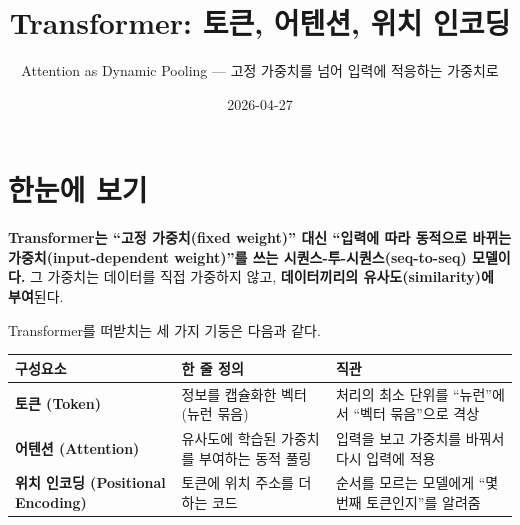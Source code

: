 \documentclass[
  korean,
]{article}
\title{Transformer: 토큰, 어텐션, 위치 인코딩}
\subtitle{Attention as Dynamic Pooling --- 고정 가중치를 넘어 입력에
적응하는 가중치로}
\author{}
\date{2026-04-27}
\newcounter{none} %
\renewcommand*\contentsname{목차}
\newcommand\contentsname{목차}
\begin{document}
\maketitle

\renewcommand*\contentsname{목차}
{
\setcounter{tocdepth}{3}
\tableofcontents
}

\section{한눈에 보기}\label{sec-overview}

\begin{tcolorbox}[enhanced jigsaw, arc=.35mm, bottomrule=.15mm, bottomtitle=1mm, breakable, colback=white, colbacktitle=quarto-callout-tip-color!10!white, colframe=quarto-callout-tip-color-frame, coltitle=black, left=2mm, leftrule=.75mm, opacityback=0, opacitybacktitle=0.6, rightrule=.15mm, title=\textcolor{quarto-callout-tip-color}{\faLightbulb}\hspace{0.5em}{핵심 한 줄}, titlerule=0mm, toprule=.15mm, toptitle=1mm]

\textbf{Transformer는 ``고정 가중치(fixed weight)'' 대신 ``입력에 따라
동적으로 바뀌는 가중치(input-dependent weight)''를 쓰는
시퀀스-투-시퀀스(seq-to-seq) 모델이다.} 그 가중치는 데이터를 직접
가중하지 않고, \textbf{데이터끼리의 유사도(similarity)에 부여}된다.

\end{tcolorbox}

Transformer를 떠받치는 세 가지 기둥은 다음과 같다.

{\def\LTcaptype{none} %
\begin{longtable}[]{@{}
  >{\raggedright\arraybackslash}p{}
  >{\raggedright\arraybackslash}p{}
  >{\raggedright\arraybackslash}p{}@{}}
\toprule\noalign{}
\begin{minipage}[b]{\linewidth}\raggedright
구성요소
\end{minipage} & \begin{minipage}[b]{\linewidth}\raggedright
한 줄 정의
\end{minipage} & \begin{minipage}[b]{\linewidth}\raggedright
직관
\end{minipage} \\
\midrule\noalign{}
\endhead
\bottomrule\noalign{}
\endlastfoot
\textbf{토큰 (Token)} & 정보를 캡슐화한 벡터(뉴런 묶음) & 처리의 최소
단위를 ``뉴런''에서 ``벡터 묶음''으로 격상 \\
\textbf{어텐션 (Attention)} & 유사도에 학습된 가중치를 부여하는 동적
풀링 & 입력을 보고 가중치를 바꿔서 다시 입력에 적용 \\
\textbf{위치 인코딩 (Positional Encoding)} & 토큰에 위치 주소를 더하는
코드 & 순서를 모르는 모델에게 ``몇 번째 토큰인지''를 알려줌 \\
\end{longtable}
}
\end{document}
